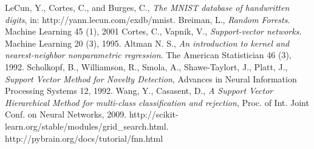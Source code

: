 \documentclass{article}
\begin{document}
\newpage
\begin{thebibliography}{9}
	 LeCun, Y., Cortes, C., and Burges, C., \emph{The MNIST database of handwritten digits}, in: http://yann.lecun.com/exdb/mnist.
	 Breiman, L., \emph{Random Forests}. Machine Learning 45 (1), 2001
	 Cortes, C., Vapnik, V., \emph{Support-vector networks}. Machine Learning 20 (3), 1995.	
	 Altman N. S., \emph{An introduction to kernel and nearest-neighbor nonparametric regression}. The American Statistician 46 (3), 1992.
     Scholkopf, B., Williamson, R., Smola, A., Shawe-Taylort, J., Platt, J., \emph{Support Vector Method for Novelty Detection}, Advances in Neural Information Processing Systems 12, 1992. 
     Wang, Y., Casasent, D., \emph{A Support Vector Hierarchical Method for multi-class classification and rejection}, Proc. of Int. Joint Conf. on Neural Networks, 2009.
     http://scikit-learn.org/stable/modules/grid\_search.html.
     http://pybrain.org/docs/tutorial/fnn.html


\end{thebibliography}
\end{document}
